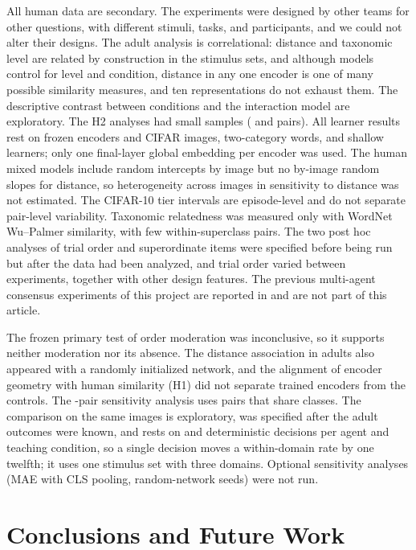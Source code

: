 \documentclass[11pt]{article}
\begin{document}
All human data are secondary. The experiments were designed by other teams for other questions, with different stimuli, tasks, and participants, and we could not alter their designs. The adult analysis is correlational: distance and taxonomic level are related by construction in the stimulus sets, and although models control for level and condition, distance in any one encoder is one of many possible similarity measures, and ten representations do not exhaust them. The descriptive contrast between conditions and the interaction model are exploratory. The H2 analyses had small samples (\HTwoThingsN{} and \HTwoHsjN{} pairs). All learner results rest on frozen encoders and CIFAR images, two-category words, and shallow learners; only one final-layer global embedding per encoder was used. The human mixed models include random intercepts by image but no by-image random slopes for distance, so heterogeneity across images in sensitivity to distance was not estimated. The CIFAR-10 tier intervals are episode-level and do not separate pair-level variability. Taxonomic relatedness was measured only with WordNet Wu--Palmer similarity, with few within-superclass pairs. The two post hoc analyses of trial order and superordinate items were specified before being run but after the data had been analyzed, and trial order varied between experiments, together with other design features. The previous multi-agent consensus experiments of this project are reported in \textcite{vera2026lexical} and are not part of this article.

The frozen primary test of order moderation was inconclusive, so it supports neither moderation nor its absence. The distance association in adults also appeared with a randomly initialized network, and the alignment of encoder geometry with human similarity (H1) did not separate trained encoders from the controls. The \VtDallN-pair sensitivity analysis uses pairs that share classes. The comparison on the same images is exploratory, was specified after the adult outcomes were known, and rests on \VtXInN{} and \VtXOutN{} deterministic decisions per agent and teaching condition, so a single decision moves a within-domain rate by one twelfth; it uses one stimulus set with three domains. Optional sensitivity analyses (MAE with CLS pooling, random-network seeds) were not run.


\section{Conclusions and Future Work}
\end{document}
